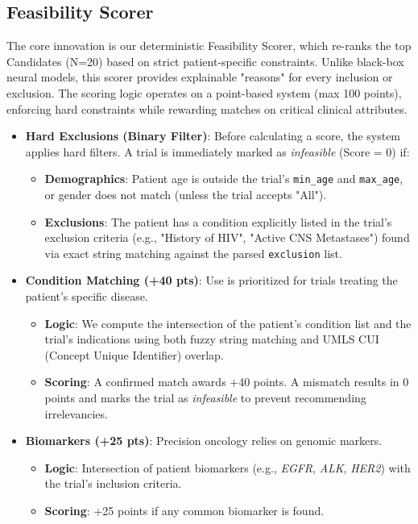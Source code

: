 \documentclass[11pt]{article}
\begin{document}
\subsection{Feasibility Scorer}
The core innovation is our deterministic Feasibility Scorer, which re-ranks the top Candidates (N=20) based on strict patient-specific constraints. Unlike black-box neural models, this scorer provides explainable "reasons" for every inclusion or exclusion.
The scoring logic operates on a point-based system (max 100 points), enforcing hard constraints while rewarding matches on critical clinical attributes.
\begin{itemize}
\item \textbf{Hard Exclusions (Binary Filter)}:
Before calculating a score, the system applies hard filters. A trial is immediately marked as \textit{infeasible} (Score = 0) if:
\begin{itemize}
\item \textbf{Demographics}: Patient age is outside the trial's \texttt{min\_age} and \texttt{max\_age}, or gender does not match (unless the trial accepts "All").
\item \textbf{Exclusions}: The patient has a condition explicitly listed in the trial's exclusion criteria (e.g., "History of HIV", "Active CNS Metastases") found via exact string matching against the parsed \texttt{exclusion} list.
\end{itemize}
\item \textbf{Condition Matching (+40 pts)}:
Use is prioritized for trials treating the patient's specific disease.
\begin{itemize}
\item \textbf{Logic}: We compute the intersection of the patient's condition list and the trial's indications using both fuzzy string matching and UMLS CUI (Concept Unique Identifier) overlap.
\item \textbf{Scoring}: A confirmed match awards +40 points. A mismatch results in 0 points and marks the trial as \textit{infeasible} to prevent recommending irrelevancies.
\end{itemize}
\item \textbf{Biomarkers (+25 pts)}:
Precision oncology relies on genomic markers.
\begin{itemize}
\item \textbf{Logic}: Intersection of patient biomarkers (e.g., \textit{EGFR}, \textit{ALK}, \textit{HER2}) with the trial's inclusion criteria.
\item \textbf{Scoring}: +25 points if any common biomarker is found.

\end{itemize}
\end{itemize}
\end{document}
